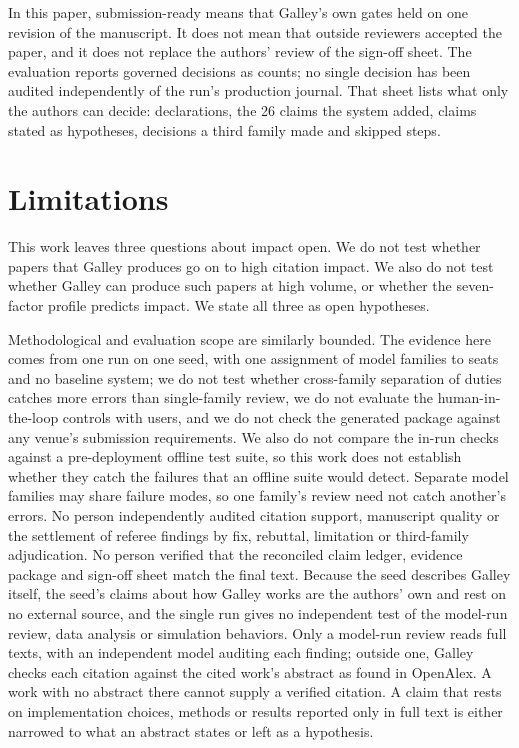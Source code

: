 \documentclass[
]{article}
\begin{document}
In this paper, submission-ready means that Galley's own gates held on
one revision of the manuscript. It does not mean that outside reviewers
accepted the paper, and it does not replace the authors' review of the
sign-off sheet. The evaluation reports governed decisions as counts; no
single decision has been audited independently of the run's production
journal. That sheet lists what only the authors can decide:
declarations, the 26 claims the system added, claims stated as
hypotheses, decisions a third family made and skipped steps.

\section{Limitations}\label{limitations}

This work leaves three questions about impact open. We do not test
whether papers that Galley produces go on to high citation impact. We
also do not test whether Galley can produce such papers at high volume,
or whether the seven-factor profile predicts impact. We state all three
as open hypotheses.

Methodological and evaluation scope are similarly bounded. The evidence
here comes from one run on one seed, with one assignment of model
families to seats and no baseline system; we do not test whether
cross-family separation of duties catches more errors than single-family
review, we do not evaluate the human-in-the-loop controls with users,
and we do not check the generated package against any venue's submission
requirements. We also do not compare the in-run checks against a
pre-deployment offline test suite, so this work does not establish
whether they catch the failures that an offline suite would detect.
Separate model families may share failure modes, so one family's review
need not catch another's errors. No person independently audited
citation support, manuscript quality or the settlement of referee
findings by fix, rebuttal, limitation or third-family adjudication. No
person verified that the reconciled claim ledger, evidence package and
sign-off sheet match the final text. Because the seed describes Galley
itself, the seed's claims about how Galley works are the authors' own
and rest on no external source, and the single run gives no independent
test of the model-run review, data analysis or simulation behaviors.
Only a model-run review reads full texts, with an independent model
auditing each finding; outside one, Galley checks each citation against
the cited work's abstract as found in OpenAlex. A work with no abstract
there cannot supply a verified citation. A claim that rests on
implementation choices, methods or results reported only in full text is
either narrowed to what an abstract states or left as a hypothesis.
\end{document}
